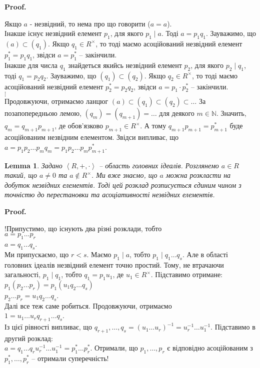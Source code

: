 \documentclass[a4paper, 10pt]{article}
\makeatletter
\theoremstyle{theoremdd}
\theoremstyle{theoremdd}
\theoremstyle{theoremdd}
\theoremstyle{theoremdd}
\theoremstyle{theoremdd}
\theoremstyle{theoremdd}
\theoremstyle{theoremdd}
\theoremstyle{theoremdd}
\theoremstyle{theoremdd}
\theoremstyle{theoremdd}
\theoremstyle{theoremdd}
\theoremstyle{theoremdd}
\theoremstyle{theoremdd}
\newtheorem{lemma}[theorem]{Lemma}
\theoremstyle{theoremdd}
\theoremstyle{theoremdd}
\renewenvironment{proof}[1][Proof.\\]{\par
\pushQED{\hfill \qed}%
\normalfont \topsep6\p@\@plus6\p@\relax
\trivlist
\item\relax
{\bfseries
#1\@addpunct{.}}\hspace\labelsep\ignorespaces
}{%
\popQED\endtrivlist\@endpefalse
}
\makeatother
\begin{document}
\begin{proof}
Якщо $a$ - незвідний, то нема про що говорити ($a = a$).\\
Інакше існує незвідний елемент $p_1$, для якого $p_1 \mid a$. Тоді $a = p_1 q_1$. Зауважимо, що $(a) \subset (q_1)$. Якщо $q_1 \in R^\times$, то тоді маємо асоційований незвідний елемент $p_1^* = p_1 q_1$, звідси $a = p_1^*$ -- закінчили.\\
Інакше для числа $q_1$ знайдеться якийсь незвідний елемент $p_2$, для якого $p_2 \mid q_1$, тоді $q_1 = p_2 q_2$. Зауважимо, що $(q_1) \subset (q_2)$. Якщо $q_2 \in R^\times$, то тоді маємо асоційований незвідний елемент $p_2^* = p_2 q_2$, звідси $a = p_1 \cdot p_2^*$ -- закінчили.\\
$\vdots$\\
Продовжуючи, отримаємо ланцюг $(a) \subset (q_1) \subset (q_2) \subset \dots$ За позапопередньою лемою, $(q_m) = (q_{m+1}) = \dots$ для деякого $m \in \mathbb{N}$. Значить, $q_m = q_{m+1} p_{m+1}$, де обов'язково $p_{m+1} \in R^\times$. А тому $q_{m+1} p_{m+1} = p_{m+1}^*$ буде асоційованим незвідним елементом. Звідси випливає, що $a = p_1p_2 \dots p_m q_m = p_1 p_2 \dots p_m p_{m+1}^*$.
\end{proof}

\begin{lemma}
Задано $\left<R,+,\cdot \right>$ -- область головних ідеалів. Розглянемо $a \in R$ такий, що $a \neq 0$ та $a \notin R^\times$. Ми вже знаємо, що $a$ можна розкласти на добуток незвідних елементів. Тоді цей розклад розписується єдиним чином з точністю до перестановки та асоціативності незвідних елементів.
\end{lemma}

\begin{proof}
!Припустимо, що існують два різні розклади, тобто\\
$a = p_1 \dots p_r$\\
$a = q_1 \dots q_s$.\\
Ми припускаємо, що $r < s$. Маємо $p_1 \mid a$, тобто $p_1 \mid q_1 \dots q_s$. Але в області головних ідеалів незвідний елемент точно простий. Тому, не втрачаючи загальності, $p_1 \mid q_1$, тобто $q_1 = p_1 u_1$, де $u_1 \in R^\times$. Підставимо отримане:\\
$p_1 ( p_2 \dots p_r) = p_1 (u_1 q_2 \dots q_s)$\\
$p_2 \dots p_r = u_1 q_2 \dots q_s$.\\
Далі все теж саме робиться. Продовжуючи, отримаємо\\
$1 = u_1 \dots u_r q_{r+1} \dots q_s$.\\
Із цієї рівності випливає, що $q_{r+1},\dots,q_s = (u_1 \dots u_r)^{-1} = u_r^{-1} \dots u_1^{-1}$. Підставимо в другий розклад:\\
$a = q_1 \dots q_r u_r^{-1} \dots u_1^{-1} = p_1^* \dots p_r^*$. Отримали, що $p_1,\dots,p_r$ є відповідно асоційованим з $p_1^*,\dots,p_r^*$ -- отримали суперечність!
\end{proof}
\end{document}
